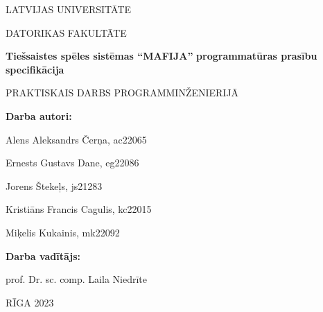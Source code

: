 \begin{titlepage}
	\thispagestyle{empty}
	\begin{center}
		\MakeUppercase{\large Latvijas Universitāte}

		\MakeUppercase{\large Datorikas Fakultāte}

		\vfill
		\textbf{\Large Tiešsaistes spēles sistēmas ``MAFIJA''}
		\textbf{\Large programmatūras prasību specifikācija}


		\vspace{1cm}
		\MakeUppercase{Praktiskais darbs programminženierijā}
		\vfill
	\end{center}
	\begin{flushright}
		\textbf{Darba autori:}

		Alens Aleksandrs Čerņa, ac22065

		Ernests Gustavs Dane, eg22086

		Jorens Štekeļs, js21283

		Kristiāns Francis Cagulis, kc22015

		Miķelis Kukainis, mk22092

		\vspace{1cm}
		\textbf{Darba vadītājs:}

		prof. Dr. sc. comp. Laila Niedrīte
	\end{flushright}
	\vspace{1cm}
	\begin{center}
		RĪGA 2023
	\end{center}
\end{titlepage}
